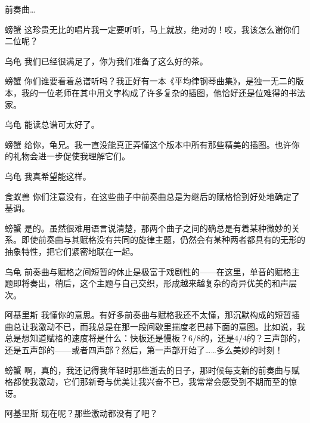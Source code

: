 \begin{dialog}{前奏曲…}
\begin{dialogue}
\item[螃蟹]这珍贵无比的唱片我一定要听听，马上就放，绝对的！哎，我该怎么谢你们二位呢？

\item[乌龟]我们已经很满足了，你为我们准备了这么好的茶。


\item[螃蟹]你们谁要看着总谱听吗？我正好有一本《平均律钢琴曲集》，是独一无二的版本，我的一位老师在其中用文字构成了许多复杂的插图，他恰好还是位难得的书法家。

\item[乌龟]能读总谱可太好了。


\item[螃蟹]给你，龟兄。我一直没能真正弄懂这个版本中所有那些精美的插图。也许你的礼物会进一步促使我理解它们。

\item[乌龟]我真希望能这样。

\item[食蚁兽]你们注意没有，在这些曲子中前奏曲总是为继后的赋格恰到好处地确定了基调。

\item[螃蟹]是的。虽然很难用语言说清楚，那两个曲子之间的确总是有着某种微妙的关系。即使前奏曲与其赋格没有共同的旋律主题，仍然会有某种两者都具有的无形的抽象特性，把它们紧密地联在一起。

\item[乌龟]前奏曲与赋格之间短暂的休止是极富于戏剧性的——在这里，单音的赋格主题即将奏出，稍后，这个主题与自己交织，形成越来越复杂的奇异优美的和声层次。

\item[阿基里斯]我懂你的意思。有好多前奏曲与赋格我还不太懂，那沉默构成的短暂插曲总让我激动不已，而我总是在那一段间歇里揣度老巴赫下面的意图。比如说，我总是想知道赋格的速度将是什么：快板还是慢板？$6/8$的，还是$4/4$的？三声部的，还是五声部的——或者四声部？然后，第一声部开始了……多么美妙的时刻！

\item[螃蟹]啊，真的，我还记得我年轻时那些逝去的日子，那时候每支新的前奏曲与赋格都使我激动，它们那新奇与优美让我兴奋不已，我常常会感受到不期而至的惊讶。

\item[阿基里斯]现在呢？那些激动都没有了吧？


\end{dialogue}
\end{dialog}
